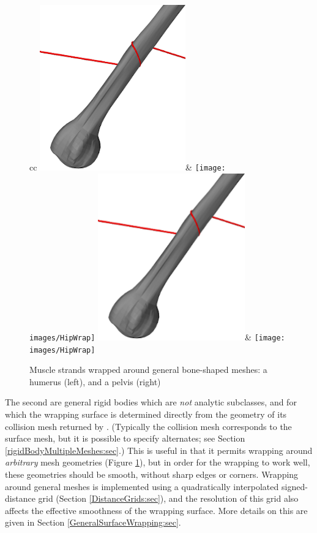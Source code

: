 \begin{figure}[ht]
\begin{center}
\begin{tabular}{cc}
\iflatexml
 \includegraphics[]{images/HumerusWrap}&
 \texttt{[image: images/HipWrap]}
\else
 \includegraphics[width=2.5in]{images/HumerusWrap}&
 \texttt{[image: images/HipWrap]}
\fi
\end{tabular}
\end{center}
\caption{Muscle strands wrapped around general bone-shaped meshes: a
humerus (left), and a pelvis (right)}
\label{GeneralWrapping:fig}
\end{figure}

The second are general rigid bodies which are {\it not} analytic
subclasses, and for which the wrapping surface is determined directly
from the geometry of its collision mesh returned by
.  (Typically the
collision mesh corresponds to the surface mesh, but it is possible to
specify alternates; see Section \ref{rigidBodyMultipleMeshes:sec}.)
This is useful in that it permits wrapping around {\it arbitrary} mesh
geometries (Figure \ref{GeneralWrapping:fig}), but in order for the
wrapping to work well, these geometries should be smooth, without
sharp edges or corners.  Wrapping around general meshes is implemented
using a quadratically interpolated signed-distance grid (Section
\ref{DistanceGrids:sec}), and the resolution of this grid also affects
the effective smoothness of the wrapping surface. More details on this
are given in Section \ref{GeneralSurfaceWrapping:sec}.

